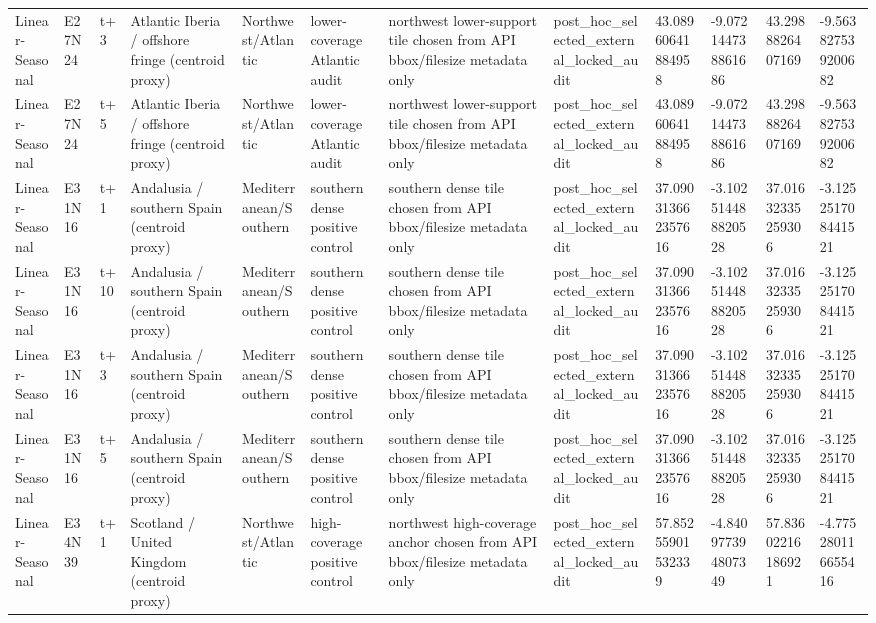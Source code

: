 \begin{landscape}
\begin{longtable}{llllllllllll}
Linear-Seasonal & E27N24 & t+3 & Atlantic Iberia / offshore fringe (centroid proxy) & Northwest/Atlantic & lower-coverage Atlantic audit & northwest lower-support tile chosen from API bbox/filesize metadata only & post\_hoc\_selected\_external\_locked\_audit & 43.08960641884958 & -9.072144738861686 & 43.2988826407169 & -9.563827539200682 \\
Linear-Seasonal & E27N24 & t+5 & Atlantic Iberia / offshore fringe (centroid proxy) & Northwest/Atlantic & lower-coverage Atlantic audit & northwest lower-support tile chosen from API bbox/filesize metadata only & post\_hoc\_selected\_external\_locked\_audit & 43.08960641884958 & -9.072144738861686 & 43.2988826407169 & -9.563827539200682 \\
Linear-Seasonal & E31N16 & t+1 & Andalusia / southern Spain (centroid proxy) & Mediterranean/Southern & southern dense positive control & southern dense tile chosen from API bbox/filesize metadata only & post\_hoc\_selected\_external\_locked\_audit & 37.090313662357616 & -3.102514488820528 & 37.01632335259306 & -3.125251708441521 \\
Linear-Seasonal & E31N16 & t+10 & Andalusia / southern Spain (centroid proxy) & Mediterranean/Southern & southern dense positive control & southern dense tile chosen from API bbox/filesize metadata only & post\_hoc\_selected\_external\_locked\_audit & 37.090313662357616 & -3.102514488820528 & 37.01632335259306 & -3.125251708441521 \\
Linear-Seasonal & E31N16 & t+3 & Andalusia / southern Spain (centroid proxy) & Mediterranean/Southern & southern dense positive control & southern dense tile chosen from API bbox/filesize metadata only & post\_hoc\_selected\_external\_locked\_audit & 37.090313662357616 & -3.102514488820528 & 37.01632335259306 & -3.125251708441521 \\
Linear-Seasonal & E31N16 & t+5 & Andalusia / southern Spain (centroid proxy) & Mediterranean/Southern & southern dense positive control & southern dense tile chosen from API bbox/filesize metadata only & post\_hoc\_selected\_external\_locked\_audit & 37.090313662357616 & -3.102514488820528 & 37.01632335259306 & -3.125251708441521 \\
Linear-Seasonal & E34N39 & t+1 & Scotland / United Kingdom (centroid proxy) & Northwest/Atlantic & high-coverage positive control & northwest high-coverage anchor chosen from API bbox/filesize metadata only & post\_hoc\_selected\_external\_locked\_audit & 57.85255901532339 & -4.840977394807349 & 57.83602216186921 & -4.775280116655416 \\

\end{longtable}
\end{landscape}
